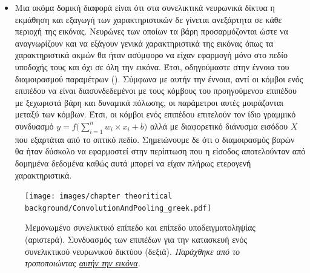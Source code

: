\begin{itemize}
  \item Μια ακόμα δομική διαφορά είναι ότι στα συνελικτικά νευρωνικά δίκτυα η εκμάθηση και εξαγωγή των χαρακτηριστικών δε γίνεται ανεξάρτητα σε κάθε περιοχή της εικόνας. Νευρώνες των οποίων τα βάρη προσαρμόζονται ώστε να αναγνωρίζουν και να εξάγουν γενικά χαρακτηριστικά της εικόνας όπως τα χαρακτηριστικά ακμών θα ήταν ασύμφορο να είχαν εφαρμογή μόνο στο πεδίο υποδοχής τους και όχι σε όλη την εικόνα. Έτσι, οδηγούμαστε στην έννοια του διαμοιρασμού παραμέτρων (). Σύμφωνα με αυτήν την έννοια, αντί οι κόμβοι ενός επιπέδου να είναι διασυνδεδεμένοι με τους κόμβους του προηγούμενου επιπέδου με ξεχωριστά βάρη και δυναμικά πόλωσης, οι παράμετροι αυτές μοιράζονται μεταξύ των κόμβων. Έτσι, οι κόμβοι ενός επιπέδου επιτελούν τον ίδιο γραμμικό συνδυασμό $y = f\Big(\sum_{i = 1}^{n} w_i \times x_i  +  b\Big)$ αλλά με διαφορετικό διάνυσμα εισόδου $X$ που εξαρτάται από το οπτικό πεδίο. Σημειώνουμε δε ότι ο διαμοιρασμός βαρών θα ήταν δύσκολο να εφαρμοστεί στην περίπτωση που η είσοδος αποτελούνταν από δομημένα δεδομένα καθώς αυτά μπορεί να είχαν πλήρως ετερογενή χαρακτηριστικά.
\end{itemize}

\begin{figure}[h]
  \centering
  \texttt{[image: images/chapter theoritical background/ConvolutionAndPooling\_greek.pdf]}
  \caption{Μεμονωμένο συνελικτικό επίπεδο και επίπεδο υποδειγματοληψίας (αριστερά). Συνδυασμός των επιπέδων για την κατασκευή ενός συνελικτικού νευρωνικού δικτύου (δεξιά). \textit{Παράχθηκε από το \href{https://inkscape.org/}{} τροποποιώντας \href{https://commons.wikimedia.org/wiki/File:ConvolutionAndPooling.svg}{αυτήν την εικόνα}.}}
  \label{fig:_conv_and_pooling}
\end{figure}


